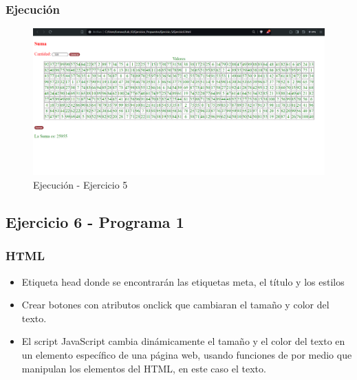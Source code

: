 \documentclass{article}
\begin{document}
	\subsubsection{Ejecución}
	\begin{figure}[H]
		\centering
		\includegraphics[width=1\textwidth,keepaspectratio]{img/HTML4.png}
		\caption{Ejecución - Ejercicio 5}
	\end{figure}
	
	
	\subsection{Ejercicio 6 - Programa 1}
	\subsubsection{HTML}
	\begin{itemize}
		\item Etiqueta head donde se encontrarán las etiquetas meta, el título y los estilos  
		
		\newpage
		\item Crear botones con atributos onclick que cambiaran el tamaño y color del texto.
		
		\item El script JavaScript cambia dinámicamente el tamaño y el color del texto en un elemento específico de una página web, usando funciones de por medio que manipulan los elementos del HTML, en este caso el texto.
		
	\end{itemize}
\end{document}
